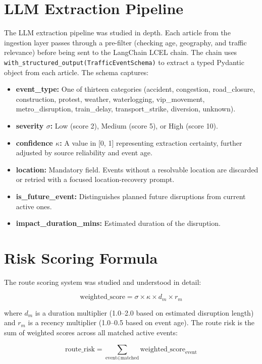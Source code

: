 \documentclass[12pt, a4paper]{report}
\begin{document}
\section{LLM Extraction Pipeline}

The LLM extraction pipeline was studied in depth. Each article from the ingestion layer passes through a pre-filter (checking age, geography, and traffic relevance) before being sent to the LangChain LCEL chain. The chain uses \texttt{with\_structured\_output(TrafficEventSchema)} to extract a typed Pydantic object from each article. The schema captures:

\begin{itemize}
    \item \textbf{event\_type:} One of thirteen categories (accident, congestion, road\_closure, construction, protest, weather, waterlogging, vip\_movement, metro\_disruption, train\_delay, transport\_strike, diversion, unknown).
    \item \textbf{severity $\sigma$:} Low (score 2), Medium (score 5), or High (score 10).
    \item \textbf{confidence $\kappa$:} A value in [0, 1] representing extraction certainty, further adjusted by source reliability and event age.
    \item \textbf{location:} Mandatory field. Events without a resolvable location are discarded or retried with a focused location-recovery prompt.
    \item \textbf{is\_future\_event:} Distinguishes planned future disruptions from current active ones.
    \item \textbf{impact\_duration\_mins:} Estimated duration of the disruption.
\end{itemize}

\section{Risk Scoring Formula}

The route scoring system was studied and understood in detail:

\[
\text{weighted\_score} = \sigma \times \kappa \times d_m \times r_m
\]

where $d_m$ is a duration multiplier (1.0--2.0 based on estimated disruption length) and $r_m$ is a recency multiplier (1.0--0.5 based on event age). The route risk is the sum of weighted scores across all matched active events:

\[
\text{route\_risk} = \sum_{\text{event} \in \text{matched}} \text{weighted\_score}_{\text{event}}
\]
\end{document}
